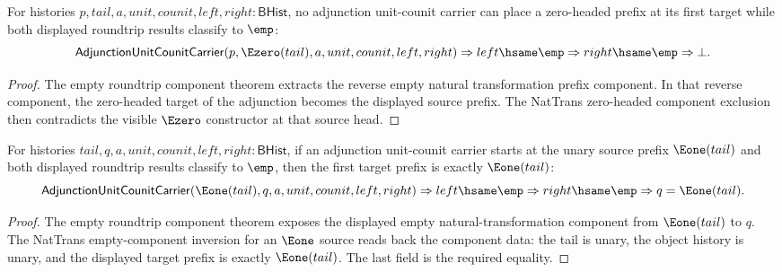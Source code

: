 \begin{theorem}
\label{thm:equivcat-adjunction-empty-roundtrip-zero-target-absurd}
For histories $p,tail,a,unit,counit,left,right:\mathsf{BHist}$, no
adjunction unit-counit carrier can place a zero-headed prefix at its first
target while both displayed roundtrip results classify to $\emp$:
$$
\mathsf{AdjunctionUnitCounitCarrier}
  (p,\Ezero(tail),a,unit,counit,left,right)
\Rightarrow left\hsame\emp
\Rightarrow right\hsame\emp
\Rightarrow \bot.
$$
\end{theorem}
\begin{proof}
The empty roundtrip component theorem extracts the reverse empty natural
transformation prefix component. In that reverse component, the zero-headed
target of the adjunction becomes the displayed source prefix. The NatTrans
zero-headed component exclusion then contradicts the visible $\Ezero$
constructor at that source head.
\end{proof}

\begin{theorem}
\label{thm:equivcat-adjunction-empty-roundtrip-e1-source-target-eq}
For histories $tail,q,a,unit,counit,left,right:\mathsf{BHist}$, if an
adjunction unit-counit carrier starts at the unary source prefix
$\Eone(tail)$ and both displayed roundtrip results classify to $\emp$, then
the first target prefix is exactly $\Eone(tail)$:
$$
\mathsf{AdjunctionUnitCounitCarrier}
  (\Eone(tail),q,a,unit,counit,left,right)
\Rightarrow left\hsame\emp
\Rightarrow right\hsame\emp
\Rightarrow q=\Eone(tail).
$$
\end{theorem}
\begin{proof}
The empty roundtrip component theorem exposes the displayed empty
natural-transformation component from $\Eone(tail)$ to $q$. The NatTrans
empty-component inversion for an $\Eone$ source reads back the component data:
the tail is unary, the object history is unary, and the displayed target
prefix is exactly $\Eone(tail)$. The last field is the required equality.
\end{proof}

